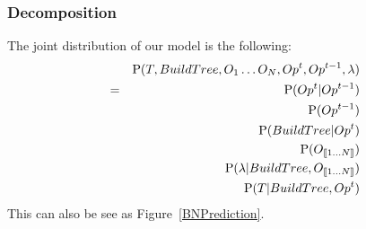 \subsubsection{Decomposition}
The joint distribution of our model is the following:
\begin{eqnarray*}
    & & \mathrm{P}(T, BuildTree, O_1 \dots O_N, Op^t, Op^{t-1}, \lambda) \\ 
& = &   \mathrm{P}(Op^t | Op^{t-1}) \\
    & & \mathrm{P}(Op^{t-1}) \\
    & & \mathrm{P}(BuildTree | Op^t) \\
    & & \mathrm{P}(O_{\llbracket 1 \dots N\rrbracket}) \\
    & & \mathrm{P}(\lambda | BuildTree, O_{\llbracket 1 \dots N\rrbracket}) \\
    & & \mathrm{P}(T | BuildTree, Op^t) 
\end{eqnarray*}
This can also be see as Figure~\ref{BNPrediction}.

